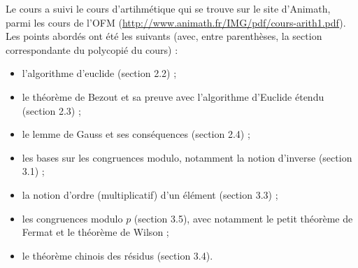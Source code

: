Le cours a suivi le cours d'artihm\'etique qui se trouve sur le site d'Animath, parmi les cours de l'OFM (\url{http://www.animath.fr/IMG/pdf/cours-arith1.pdf}). Les points abord\'es ont \'et\'e les suivants (avec, entre parenth\`eses, la section correspondante du polycopi\'e du cours) :

\begin{itemize}
\item l'algorithme d'euclide (section 2.2) ;
\item le th\'eor\`eme de Bezout et sa preuve avec l'algorithme d'Euclide \'etendu (section 2.3) ;
\item le lemme de Gauss et ses cons\'equences (section 2.4) ;
\item les bases sur les congruences modulo, notamment la notion d'inverse (section 3.1) ;
\item la notion d'ordre (multiplicatif) d'un \'el\'ement (section 3.3) ;
\item les congruences modulo $p$ (section 3.5), avec notamment le petit th\'eor\`eme de Fermat et le th\'eor\`eme de Wilson ;
\item le th\'eor\`eme chinois des r\'esidus (section 3.4).
\end{itemize}

